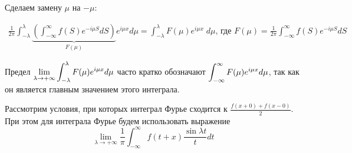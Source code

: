 Сделаем замену $\mu$ на $-\mu$:

\begin{align*}
    \frac{1}{2\pi} \int_{-\lambda}^\lambda \underbrace{\left(
        \int_{-\infty}^\infty f(S) e^{-i\mu S} dS
    \right)}_{F(\mu)} e^{i\mu x} d\mu = 
    \int_{-\lambda}^\lambda F(\mu) e^{i\mu x} \; d\mu, \,
    \text{где  } F(\mu) = \frac{1}{2\pi} 
    \int_{-\infty}^\infty f(S) e^{-i\mu S} dS
\end{align*}

Предел $\displaystyle\lim_{\lambda \to +\infty} \displaystyle\int_{-\lambda}^\lambda F(\mu) e^{i\mu x} d\mu$
часто кратко обозначают $\displaystyle\int_{-\infty}^\infty F(\mu) e^{i\mu x} d\mu$, так
как он является главным значением этого интеграла.


Рассмотрим условия, при которых интеграл Фурье сходится к
$\frac{f(x + 0) + f(x - 0)}{2}$. При этом для интеграла Фурье будем
использовать выражение
\[ \lim_{\lambda \to +\infty} \frac{1}{\pi} \int_{-\infty}^\infty f(t + x) \frac{\sin \lambda t}{t} dt \]


